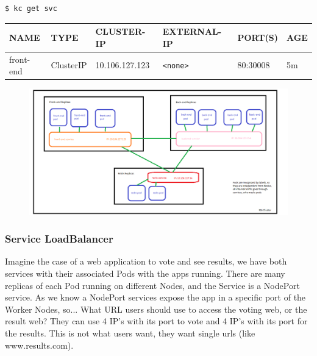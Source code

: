 \documentclass{article}
\newenvironment{codetemplate}[1][]{%
  \mybasecolorbox[#1]
  \itshape
}{%
  \endmybasecolorbox
}
\begin{document}
\begin{codetemplate}{}
\begin{verbatim}
$ kc get svc
\end{verbatim}
\end{codetemplate}

\begin{table}[H]
\begin{tabular}{| m{3cm} | m{2cm} | m{2.5cm} | m{2.7cm} | m{2cm} | m{1.2cm} |}
\hline
\textbf{NAME} & \textbf{TYPE} & \textbf{CLUSTER-IP} & \textbf{EXTERNAL-IP} & \textbf{PORT(S)} & \textbf{AGE} \\ \hline
front-end & ClusterIP & 10.106.127.123 & \verb|<none>| & 80:30008 & 5m \\ \hline
\end{tabular}
\end{table}

\begin{figure}[H]
    \centering
    \includegraphics[width=\textwidth]{pictures/services4.png}
\end{figure}

\subsubsection{Service LoadBalancer}

Imagine the case of a web application to vote and see results, we have both services with their associated Pods with the apps running. There are many replicas of each Pod running on different Nodes, and the Service is a NodePort service. As we know a NodePort services expose the app in a specific port of the Worker Nodes, so... What URL users should use to access the voting web, or the result web? They can use 4 IP's with its port to vote and 4 IP's with its port for the results. This is not what users want, they want single urls (like www.results.com).
\end{document}

